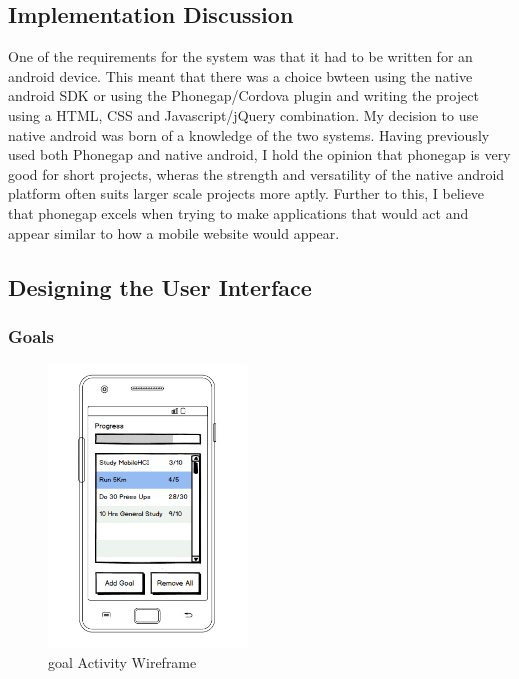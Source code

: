 \documentclass[12pt]{article} %
\begin{document}
\subsection{Implementation Discussion}

One of the requirements for the system was that it had to be written for an android device. This meant that there was a choice bwteen using the native android SDK or using the Phonegap/Cordova plugin and writing the project using a HTML, CSS and Javascript/jQuery combination. My decision to use native android was born of a knowledge of the two systems. Having previously used both Phonegap and native android, I hold the opinion that phonegap is very good for short projects, wheras the strength and versatility of the native android platform often suits larger scale projects more aptly. Further to this, I believe that phonegap excels when trying to make applications that would act and appear similar to how a mobile website would appear. 

\subsection{Designing the User Interface}

\subsubsection{Goals}

\begin{figure}
\begin{center}
\includegraphics[width=0.47\textwidth]{Goals}
\caption{goal Activity Wireframe}
\end{center}
\end{figure}
\end{document}

